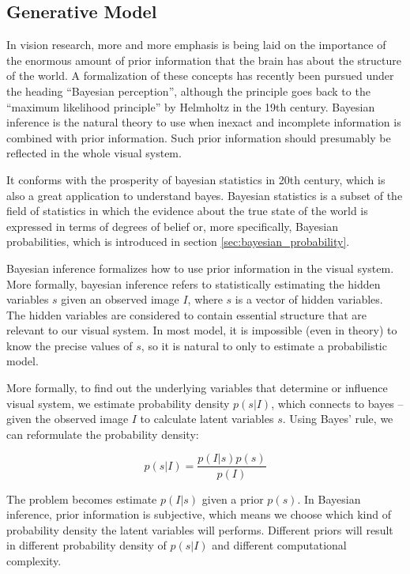 \documentclass[a4paper]{book}
\begin{document}
    \subsection{Generative Model}

    In vision research, more and more emphasis is being laid on the
    importance of the enormous amount of prior information that the
    brain has about the structure of the world. A formalization of these
    concepts has recently been pursued under the heading ``Bayesian
    perception'', although the principle goes back to the ``maximum
    likelihood principle'' by Helmholtz in the 19th century. Bayesian
    inference is the natural theory to use when inexact and incomplete
    information is combined with prior information. Such prior
    information should presumably be reflected in the whole visual
    system.

    It conforms with the prosperity of bayesian statistics in 20th
    century, which is also a great application to understand bayes.
    Bayesian statistics is a subset of the field of statistics in which
    the evidence about the true state of the world is expressed in terms
    of degrees of belief or, more specifically, Bayesian
    probabilities\cite{wiki_bayesian_probability}, which is introduced
    in section \ref{sec:bayesian_probability}.

    Bayesian inference formalizes how to use prior information in the
    visual system. More formally, bayesian inference refers to
    statistically estimating the hidden variables $s$ given an observed
    image $I$, where $s$ is a vector of hidden variables. The hidden
    variables are considered to contain essential structure that are
    relevant to our visual system. In most model, it is impossible (even
    in theory) to know the precise values of $s$, so it is natural to
    only to estimate a probabilistic model.

    More formally, to find out the underlying variables that determine
    or influence visual system, we estimate probability density
    $p(s|I)$, which connects to bayes -- given the observed image $I$ to
    calculate latent variables $s$. Using Bayes' rule, we can
    reformulate the probability density:

    \begin{displaymath}
      p(s|I) = \frac{p(I|s)p(s)}{p(I)}
    \end{displaymath}

    The problem becomes estimate $p(I|s)$ given a prior $p(s)$. In
    Bayesian inference, prior information is subjective, which means we
    choose which kind of probability density the latent variables will
    performs. Different priors will result in different probability
    density of $p(s|I)$ and different computational complexity.
\end{document}
